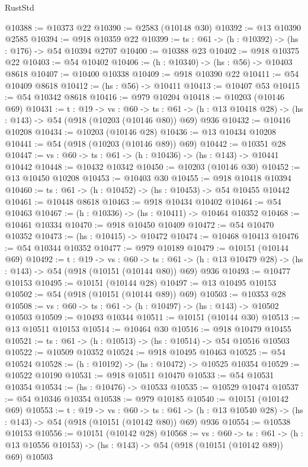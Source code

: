 \begin{lexlean}{RustStd}
\begin{coremodule}
@10388 := @10373 @22
@10390 := @2583 (@10148 @30)
@10392 := @13 @10390 @2585
@10394 := @918 @10359 @22
@10399 := {ts : @61} -> (h : @10392) -> (hs : @176) -> @54 @10394 @2707
@10400 := @10388 @23
@10402 := @918 @10375 @22
@10403 := @54 @10402
@10406 := (h : @10340) -> (hs : @56) -> @10403 @8618
@10407 := @10400 @10338
@10409 := @918 @10390 @22
@10411 := @54 @10409 @8618
@10412 := (hs : @56) -> @10411
@10413 := @10407 @53
@10415 := @54 @10342 @8618
@10416 := @979 @10204
@10418 := @10203 (@10146 @69)
@10431 := {t : @19} ->
  {vs : @60} ->
  {ts : @61} -> (h : @13 @10418 @28) -> (hs : @143) -> @54 (@918 (@10203 (@10146 @80)) @69) @936
@10432 := @10416 @10208
@10434 := @10203 (@10146 @28)
@10436 := @13 @10434 @10208
@10441 := @54 (@918 (@10203 (@10146 @89)) @69)
@10442 := @10351 @28
@10447 := {vs : @60} -> {ts : @61} -> (h : @10436) -> (hs : @143) -> @10441 @10442
@10448 := @10432 @10342
@10450 := @10203 (@10146 @30)
@10452 := @13 @10450 @10208
@10453 := @10403 @30
@10455 := @918 @10418 @10394
@10460 := {ts : @61} -> (h : @10452) -> (hs : @10453) -> @54 @10455 @10442
@10461 := @10448 @8618
@10463 := @918 @10434 @10402
@10464 := @54 @10463
@10467 := (h : @10336) -> (hs : @10411) -> @10464 @10352
@10468 := @10461 @10334
@10470 := @918 @10450 @10409
@10472 := @54 @10470 @10352
@10473 := (hs : @10415) -> @10472
@10474 := @10468 @10413
@10476 := @54 @10344 @10352
@10477 := @979 @10189
@10479 := @10151 (@10144 @69)
@10492 := {t : @19} ->
  {vs : @60} ->
  {ts : @61} -> (h : @13 @10479 @28) -> (hs : @143) -> @54 (@918 (@10151 (@10144 @80)) @69) @936
@10493 := @10477 @10153
@10495 := @10151 (@10144 @28)
@10497 := @13 @10495 @10153
@10502 := @54 (@918 (@10151 (@10144 @89)) @69)
@10503 := @10353 @28
@10508 := {vs : @60} -> {ts : @61} -> (h : @10497) -> (hs : @143) -> @10502 @10503
@10509 := @10493 @10344
@10511 := @10151 (@10144 @30)
@10513 := @13 @10511 @10153
@10514 := @10464 @30
@10516 := @918 @10479 @10455
@10521 := {ts : @61} -> (h : @10513) -> (hs : @10514) -> @54 @10516 @10503
@10522 := @10509 @10352
@10524 := @918 @10495 @10463
@10525 := @54 @10524
@10528 := (h : @10192) -> (hs : @10472) -> @10525 @10354
@10529 := @10522 @10190
@10531 := @918 @10511 @10470
@10533 := @54 @10531 @10354
@10534 := (hs : @10476) -> @10533
@10535 := @10529 @10474
@10537 := @54 @10346 @10354
@10538 := @979 @10185
@10540 := @10151 (@10142 @69)
@10553 := {t : @19} ->
  {vs : @60} ->
  {ts : @61} -> (h : @13 @10540 @28) -> (hs : @143) -> @54 (@918 (@10151 (@10142 @80)) @69) @936
@10554 := @10538 @10153
@10556 := @10151 (@10142 @28)
@10568 := {vs : @60} ->
  {ts : @61} ->
  (h : @13 @10556 @10153) -> (hs : @143) -> @54 (@918 (@10151 (@10142 @89)) @69) @10503

\end{coremodule}
\end{lexlean}
